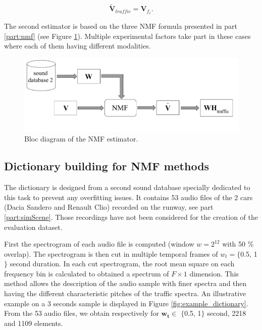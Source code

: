 \documentclass[review,5p,twocolumn,sort&compress,times]{elsarticle}
\begin{document}
\begin{equation}
\mathbf{\tilde{V}}_{traffic} = \mathbf{V}_{f_c}.
\end{equation}

The second estimator is based on the three NMF formula presented in part \ref{part:nmf} (see Figure \ref{fig:bloc_diagram_nmf}). Multiple experimental factors take part in these cases where each of them having different modalities.

\begin{figure}[t]
\centering
\includegraphics[width=.9\linewidth]{figures/bloc_diagram_NMF_EN_2.pdf}
\caption{Bloc diagram of the NMF estimator.}
\label{fig:bloc_diagram_nmf}
\end{figure}

\subsection{Dictionary building for NMF methods}\label{part:dictionary_building}

The dictionary is designed from a second sound database specially dedicated to this task to prevent any overfitting issues. It contains  53 audio files of the 2 cars (Dacia Sandero and Renault Clio) recorded on the runway, see part \ref{part:simScene}. Those recordings have not been considered for the creation of the evaluation dataset.

First the spectrogram of each audio file is computed (window $w = 2^{12}$ with 50 $\%$ overlap). The spectrogram is then cut in multiple temporal frames of $w_t  = \lbrace$0.5, 1$\rbrace$ second duration. In each cut spectrogram, the root mean square on each frequency bin is calculated to obtained a spectrum of $F \times 1$ dimension. This method allows the description of the audio sample with finer spectra and then having the different characteristic pitches of the traffic spectra. An illustrative example on a 3 seconds sample is displayed in Figure \ref{fig:example_dictionary}. From the 53 audio files, we obtain respectively for $\mathbf{w_t}\in$ $\lbrace$0.5, 1$\rbrace$ second, 2218 and 1109 elements.
\end{document}
